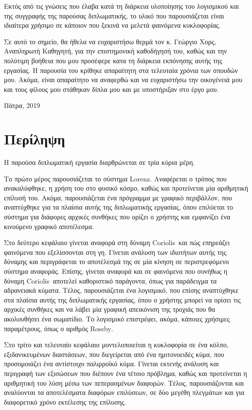 \documentclass[12pt, a4paper, oneside]{extarticle}
\numberwithin{equation}{subsection}
\def\lat#1{\textlatin{#1}}
\def\cor{\textlatin{Coriolis\ }}
\begin{document}
		Εκτός από τις γνώσεις που έλαβα κατά τη διάρκεια υλοποίησης του λογισμικού και της συγγραφής της παρούσας διπλωματικής, το υλικό που παρουσιάζεται είναι ιδιαίτερα χρήσιμο σε κάποιον που ξεκινά να μελετά φαινόμενα κυκλοφορίας.

		Σε αυτό το σημείο, θα ήθελα να ευχαριστήσω θερμά τον κ. Γεώργιο Χορς, Αναπληρωτή Καθηγητή, για την επιστημονική καθοδήγησή του, καθώς και την πολύτιμη βοήθεια που μου προσέφερε κατα τη διάρκεια εκπόνησης αυτής της εργασίας. Η παρουσία του κρίθηκε απαραίτητη στα τελευταία χρόνια των σπουδών μου. Ακόμα, είναι απαραίτητο να αναφερθώ και να ευχαριστήσω την οικογένειά μου και τους φίλους μου στάθηκαν δίπλα μου και με υποστήριξαν στο έργο μου.
		\vspace{20mm}
		\begin{flushright}
			Πάτρα, 2019
		\end{flushright}

		\cleardoublepage

	\section*{Περίληψη}
		\thispagestyle{pagenum}
		Η παρούσα διπλωματική εργασία διαρθρώνεται σε τρία κύρια μέρη.

		Το πρώτο μέρος παρουσιάζεται το σύστημα \lat{Lorenz}. Αναφέρεται ο τρόπος που ανακαλύφθηκε, η χρήση του στο φυσικό κόσμο, καθώς και προτείνεται μία αριθμητική επίλυσή του. Ακόμα, παρουσιάζεται ένα πρόγραμμα με γραφικό περιβάλλον, που αναπτύχθηκε για τα πλαίσια αυτής της διπλωματικής εργασίας, όπου επιλύεται το σύστημα για διάφορες αρχικές συνθήκες που ορίζει ο χρήστης και εμφανίζει ένα κινούμενο γραφικό αποτέλεσμα.

		Στο δεύτερο κεφάλαιο γίνεται αναφορά στη δύναμη \cor και πώς επηρεάζει φαινόμενα που εξελίσσονται στη γη. Γίνεται ανάλυση των ιδιοτήτων αυτής της δύναμης και περιγράφεται το αποτέλεσμά της σε μία κίνηση σε περιστρεφόμενο σύστημα αναφοράς. Επίσης, γίνεται αναφορά και σε φαινόμενα που συνήθως η δύναμη \cor αποτελεί καθοριστικό παράγοντα, όπως για παράδειγμα τα αδρανειακά κύματα. Τέλος, παρουσιάζεται ένα λογισμικό, που επίσης αναπτύχθηκε στα πλαίσια αυτής της διπλωματικής εργασίας, όπου ο χρήστης μπορεί να ορίσει τις αρχικές συνθήκες και να λάβει μία γραφική απεικόνιση της τροχιάς που θα ακολουθήσει ένα σωματίδιο. Το λογισμικό επιστρέφει, ακόμα, κάποιες χρήσιμες παραμέτρους, όπως ο αριθμός \lat{Rossby}.

		Στο τρίτο και τελευταίο κεφάλαιο μοντελοποιείται η κυκλοφορία σε ένα κόλπο, εξιδανικευμένων διαστάσεων, που διεγείρεται από ένα ημιτονοειδές κύμα, που προσομοιάζει ένα αντίστοιχο παλιρροϊκό κύμα. Γίνεται εκτενής ανάλυση και περιγραφή των εξισώσεων που διέπουν ένα τέτοιο πρόβλημα, καθώς και προτείνεται η αριθμητική του λύση μέσω των πεπερασμένων διαφορών. Τέλος, παρουσιάζονται και αναλύονται τα αποτελέσματα διαφόρων επιλύσεων, σε δύο μεγέθη πλεγμάτων και για διαφορετικό χρόνο εκτέλεσης της επίλυσης.
	\cleardoublepage
\end{document}
